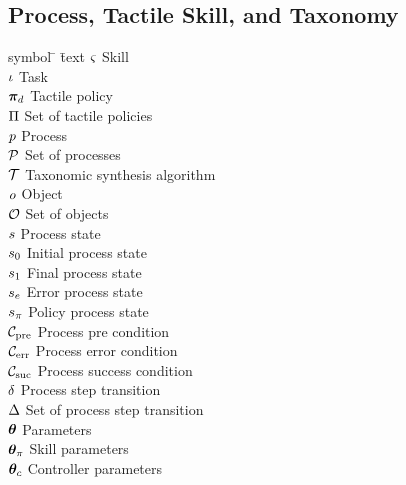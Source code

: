 \subsection*{Process, Tactile Skill, and Taxonomy}
\begin{tabbing}
symbol \= \hspace{1.5cm} \= text \kill
$\varsigma$ \> \> Skill \\[1.1ex]
$\iota$ \> \> Task \\[1.1ex]
$\boldsymbol{\pi}_d$ \> \> Tactile policy \\[1.1ex]
$\Pi$ \> \> Set of tactile policies \\[1.1ex]
$\textit{p}$ \> \> Process \\[1.1ex]
$\mathcal{P}$ \> \> Set of processes \\[1.1ex]
$\mathcal{T}$ \> \> Taxonomic synthesis algorithm \\[1.1ex]
$\mathit{o}$ \> \> Object \\[1.1ex]
$\mathcal{O}$ \> \> Set of objects \\[1.1ex]
$s$ \> \> Process state \\[1.1ex]
$s_0$ \> \> Initial process state \\[1.1ex]
$s_1$ \> \> Final process state \\[1.1ex]
$s_e$ \> \> Error process state \\[1.1ex]
$s_\pi$ \> \> Policy process state \\[1.1ex]
$\mathcal{C}_\text{pre}$ \> \> Process pre condition \\[1.1ex]
$\mathcal{C}_\text{err}$ \> \> Process error condition \\[1.1ex]
$\mathcal{C}_\text{suc}$ \> \> Process success condition \\[1.1ex]
$\delta$ \> \> Process step transition \\[1.1ex]
$\Delta$ \> \> Set of process step transition \\[1.1ex]
$\boldsymbol{\theta}$ \> \> Parameters \\[1.1ex]
$\boldsymbol{\theta}_\pi$ \> \> Skill parameters \\[1.1ex]
$\boldsymbol{\theta}_c$ \> \> Controller parameters \\[1.1ex]
\end{tabbing}

